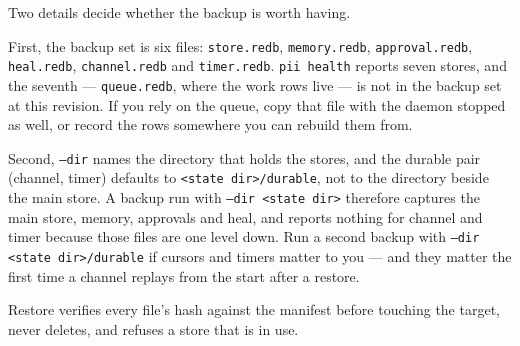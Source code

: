 \begin{center}
\end{center}

Two details decide whether the backup is worth having.

First, the backup set is six files: \texttt{store.redb}, \texttt{memory.redb},
\texttt{approval.redb}, \texttt{heal.redb}, \texttt{channel.redb} and
\texttt{timer.redb}. \texttt{pii health} reports seven stores, and the seventh ---
\texttt{queue.redb}, where the work rows live --- is not in the backup set at this
revision. If you rely on the queue, copy that file with the daemon stopped as well, or
record the rows somewhere you can rebuild them from.

Second, \texttt{--dir} names the directory that holds the stores, and the durable pair
(channel, timer) defaults to \texttt{\textless{}state dir\textgreater{}/durable}, not to the
directory beside the
main store. A backup run with \texttt{--dir \textless{}state dir\textgreater{}} therefore
captures the main store,
memory, approvals and heal, and reports nothing for channel and timer because those files
are one level down. Run a second backup with \texttt{--dir \textless{}state
dir\textgreater{}/durable} if cursors
and timers matter to you --- and they matter the first time a channel replays from the
start after a restore.

Restore verifies every file's hash against the manifest before touching the target, never
deletes, and refuses a store that is in use.

